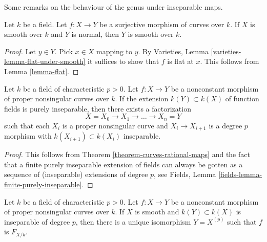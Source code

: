 \noindent
Some remarks on the behaviour of the genus under inseparable maps.

\begin{lemma}
\label{lemma-dominated-by-smooth}
Let $k$ be a field. Let $f : X \to Y$ be a surjective morphism
of curves over $k$. If $X$ is smooth over $k$ and
$Y$ is normal, then $Y$ is smooth over $k$.
\end{lemma}

\begin{proof}
Let $y \in Y$. Pick $x \in X$ mapping to $y$.
By Varieties, Lemma \ref{varieties-lemma-flat-under-smooth}
it suffices to show that $f$ is flat at $x$.
This follows from Lemma \ref{lemma-flat}.
\end{proof}

\begin{lemma}
\label{lemma-purely-inseparable}
Let $k$ be a field of characteristic $p > 0$. Let $f : X \to Y$ be a
nonconstant morphism of proper nonsingular curves over $k$.
If the extension $k(Y) \subset k(X)$ of function fields
is purely inseparable, then there exists a factorization
$$
X = X_0 \to X_1 \to \ldots \to X_n = Y
$$
such that each $X_i$ is a proper nonsingular curve
and $X_i \to X_{i + 1}$ is a degree $p$
morphism with $k(X_{i + 1}) \subset k(X_i)$
inseparable.
\end{lemma}

\begin{proof}
This follows from Theorem \ref{theorem-curves-rational-maps}
and the fact that a finite purely inseparable extension of fields
can always be gotten as a sequence of (inseparable) extensions of degree $p$,
see Fields, Lemma \ref{fields-lemma-finite-purely-inseparable}.
\end{proof}

\begin{lemma}
\label{lemma-inseparable-deg-p-smooth}
Let $k$ be a field of characteristic $p > 0$. Let $f : X \to Y$ be a
nonconstant morphism of proper nonsingular curves over $k$.
If $X$ is smooth and $k(Y) \subset k(X)$ is inseparable of degree $p$,
then there is a unique isomorphism $Y = X^{(p)}$ such that
$f$ is $F_{X/k}$.
\end{lemma}

